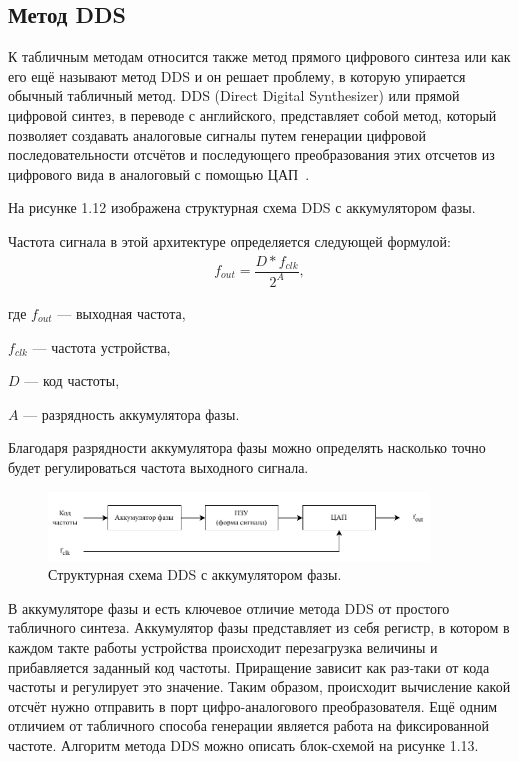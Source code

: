 \subsection{Метод DDS}	

	К табличным методам относится также метод прямого цифрового синтеза или как его ещё называют метод DDS и он решает проблему, в которую упирается обычный табличный метод. %
	DDS (Direct Digital Synthesizer) или прямой цифровой синтез, в переводе с английского, представляет собой метод, который позволяет создавать аналоговые сигналы путем генерации цифровой последовательности отсчётов и последующего преобразования этих отсчетов из цифрового вида в аналоговый с помощью ЦАП~\cite{leso}.
	
	На рисунке 1.12 изображена структурная схема DDS с аккумулятором фазы.
	
	Частота сигнала в этой архитектуре определяется следующей формулой:
	\begin{gather}
	f_{out}=\dfrac{D * f_{clk}}{2^{A}},
	\end{gather}
		
	где $f_{out}$ --- выходная частота, 
	
	$f_{clk}$ --- частота устройства, 
	
	$D$ --- код частоты, 
	
	$A$ --- разрядность аккумулятора фазы.
	
	Благодаря разрядности аккумулятора фазы можно определять насколько точно будет регулироваться частота выходного сигнала.
	
	\begin{figure}[H]
    \centering
    \includegraphics[width=0.9\textwidth]{../image/dds_func.pdf}
    \caption{Структурная схема DDS с аккумулятором фазы.}
	\end{figure}
	
	В аккумуляторе фазы и есть ключевое отличие метода DDS от простого табличного синтеза. Аккумулятор фазы представляет из себя регистр, в котором в каждом такте работы устройства происходит перезагрузка величины и прибавляется заданный код частоты. Приращение зависит как раз-таки от кода частоты и регулирует это значение. Таким образом, происходит вычисление какой отсчёт нужно отправить в порт цифро-аналогового преобразователя. Ещё одним отличием от табличного способа генерации является работа на фиксированной частоте. Алгоритм метода DDS можно описать блок-схемой на рисунке 1.13.
	
